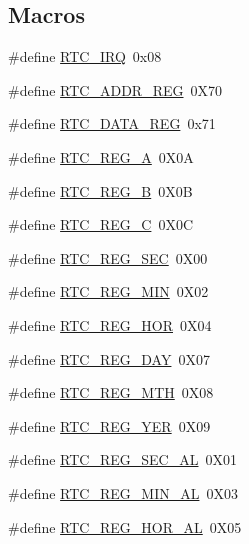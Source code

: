 \subsection*{Macros}
\begin{DoxyCompactItemize}
\item 
\#define \mbox{\hyperlink{group__rtc_ga4e22feb6ffbc1cda32fadff5c740dc51}{R\+T\+C\+\_\+\+I\+RQ}}~0x08
\item 
\#define \mbox{\hyperlink{group__rtc_ga710b98232df2c563009e6f8a6cd18220}{R\+T\+C\+\_\+\+A\+D\+D\+R\+\_\+\+R\+EG}}~0\+X70
\item 
\#define \mbox{\hyperlink{group__rtc_ga2f258a00c59c3f347c8d2d4a75471ce0}{R\+T\+C\+\_\+\+D\+A\+T\+A\+\_\+\+R\+EG}}~0x71
\item 
\#define \mbox{\hyperlink{group__rtc_gae5ffad506b363f28bed1bb5e5926bd2d}{R\+T\+C\+\_\+\+R\+E\+G\+\_\+A}}~0\+X0A
\item 
\#define \mbox{\hyperlink{group__rtc_ga03954a63ead3f02b7790ce79e9877eea}{R\+T\+C\+\_\+\+R\+E\+G\+\_\+B}}~0\+X0B
\item 
\#define \mbox{\hyperlink{group__rtc_ga1bd6f771dc313129723812fe7ac52d9e}{R\+T\+C\+\_\+\+R\+E\+G\+\_\+C}}~0\+X0C
\item 
\#define \mbox{\hyperlink{group__rtc_ga7afc252edab3838e2b8ad3b6e04bcdac}{R\+T\+C\+\_\+\+R\+E\+G\+\_\+\+S\+EC}}~0\+X00
\item 
\#define \mbox{\hyperlink{group__rtc_ga039675f88b3f7e332eaab4de7d8ddf41}{R\+T\+C\+\_\+\+R\+E\+G\+\_\+\+M\+IN}}~0\+X02
\item 
\#define \mbox{\hyperlink{group__rtc_ga2d81c4c743bc8a565069be4856ce830d}{R\+T\+C\+\_\+\+R\+E\+G\+\_\+\+H\+OR}}~0\+X04
\item 
\#define \mbox{\hyperlink{group__rtc_ga695494dc4317d4231f55866c6cf2744c}{R\+T\+C\+\_\+\+R\+E\+G\+\_\+\+D\+AY}}~0\+X07
\item 
\#define \mbox{\hyperlink{group__rtc_gabbf7b31fe483e1eb6bfe2fb3e246402a}{R\+T\+C\+\_\+\+R\+E\+G\+\_\+\+M\+TH}}~0\+X08
\item 
\#define \mbox{\hyperlink{group__rtc_gad0b4e50b2ec6c5b81912d973aef9d96d}{R\+T\+C\+\_\+\+R\+E\+G\+\_\+\+Y\+ER}}~0\+X09
\item 
\#define \mbox{\hyperlink{group__rtc_ga10e31043859e4c053fc109bedcd6ef2f}{R\+T\+C\+\_\+\+R\+E\+G\+\_\+\+S\+E\+C\+\_\+\+AL}}~0\+X01
\item 
\#define \mbox{\hyperlink{group__rtc_ga70094248bc98e6b49c142bd79f9985fe}{R\+T\+C\+\_\+\+R\+E\+G\+\_\+\+M\+I\+N\+\_\+\+AL}}~0\+X03
\item 
\#define \mbox{\hyperlink{group__rtc_gad277f64406227f73426e588769abd954}{R\+T\+C\+\_\+\+R\+E\+G\+\_\+\+H\+O\+R\+\_\+\+AL}}~0\+X05

\end{DoxyCompactItemize}
